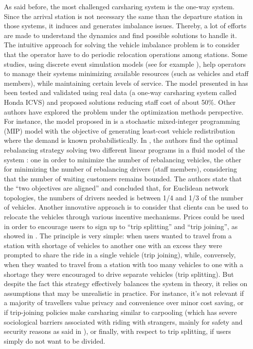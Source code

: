 \begin{bibunit}[ieeetr]
As said before, the most challenged carsharing system is the one-way system. Since the arrival station is not necessary the same than the departure station in those systems, it induces and generates imbalance issues.
Thereby, a lot of efforts are made to understand the dynamics and find possible solutions to handle it.
The intuitive approach for solving the vehicle imbalance problem is to consider that the operator have to do periodic relocation operations among stations.
Some studies, using discrete event simulation models (see for example \cite{barth_simulation_1999, kek_relocation_2006, kek_decision_2009}), help operators to manage their systems minimizing available resources (such as vehicles and staff members), while maintaining certain levels of service.
The model presented in \cite{kek_decision_2009} has been tested and validated using real data (a one-way carsharing system called Honda ICVS) and proposed solutions reducing staff cost of about 50\%.
Other authors have explored the problem under the optimization methods perspective.
For instance, the model proposed in \cite{nair_fleet_2011} is a stochastic mixed-integer programming (MIP) model with the objective of generating least-cost vehicle redistribution where the demand is known probabilistically.
In \cite{smith_rebalancing_2013}, the authors find the optimal rebalancing strategy solving two different linear programs in a fluid model of the system : one in order to minimize the number of rebalancing vehicles, the other for minimizing the number of rebalancing drivers (staff members), considering that the number of waiting customers remains bounded.
The authors state that the ``two objectives are aligned'' and concluded that, for Euclidean network topologies, the numbers of drivers needed is between 1/4 and 1/3 of the number of vehicles.
Another innovative approach is to consider that clients can be used to relocate the vehicles through various incentive mechanisms.
Prices could be used in order to encourage users to sign up to ``trip splitting'' and ``trip joining'', as showed in \cite{barth_user_based_2004}.
The principle is very simple: when users wanted to travel from a station with shortage of vehicles to another one with an excess they were prompted to share the ride in a single vehicle (trip joining), while, conversely, when they wanted to travel from a station with too many vehicles to one with a shortage they were encouraged to drive separate vehicles (trip splitting).
But despite the fact this strategy effectively balances the system in theory, it relies on assumptions that may be unrealistic in practice.
For instance, it's not relevant if a majority of travellers value privacy and convenience over minor cost saving, or if trip-joining policies make carsharing similar to carpooling (which has severe sociological barriers associated with riding with strangers, mainly for safety and security reasons as said in \cite{chan_ridesharing_2012, correia_carpooling_2011}), or finally, with respect to trip splitting, if users simply do not want to be divided.


\end{bibunit}
